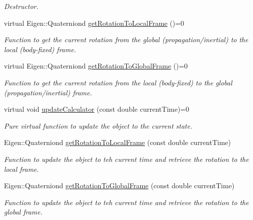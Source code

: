 \begin{DoxyCompactItemize}
\begin{DoxyCompactList}\small\item\em Destructor. \end{DoxyCompactList}\item 
virtual Eigen\+::\+Quaterniond \hyperlink{classtudat_1_1reference__frames_1_1DependentOrientationCalculator_ae55893820994179e02ec6189cd9fb00b}{get\+Rotation\+To\+Local\+Frame} ()=0
\begin{DoxyCompactList}\small\item\em Function to get the current rotation from the global (propagation/inertial) to the local (body-\/fixed) frame. \end{DoxyCompactList}\item 
virtual Eigen\+::\+Quaterniond \hyperlink{classtudat_1_1reference__frames_1_1DependentOrientationCalculator_a1b34033b2b7a0a65fa88482b3cbb46af}{get\+Rotation\+To\+Global\+Frame} ()=0
\begin{DoxyCompactList}\small\item\em Function to get the current rotation from the local (body-\/fixed) to the global (propagation/inertial) frame. \end{DoxyCompactList}\item 
virtual void \hyperlink{classtudat_1_1reference__frames_1_1DependentOrientationCalculator_a801bc21f0df6beecea976cf5728c79ce}{update\+Calculator} (const double current\+Time)=0
\begin{DoxyCompactList}\small\item\em Pure virtual function to update the object to the current state. \end{DoxyCompactList}\item 
Eigen\+::\+Quaterniond \hyperlink{classtudat_1_1reference__frames_1_1DependentOrientationCalculator_ac26bdf7e4506d22f9b1cbec406643255}{get\+Rotation\+To\+Local\+Frame} (const double current\+Time)
\begin{DoxyCompactList}\small\item\em Function to update the object to teh current time and retrieve the rotation to the local frame. \end{DoxyCompactList}\item 
Eigen\+::\+Quaterniond \hyperlink{classtudat_1_1reference__frames_1_1DependentOrientationCalculator_adc0c3adf1fa3997907446579de013a95}{get\+Rotation\+To\+Global\+Frame} (const double current\+Time)
\begin{DoxyCompactList}\small\item\em Function to update the object to teh current time and retrieve the rotation to the global frame. \end{DoxyCompactList}\item 

\end{DoxyCompactItemize}
